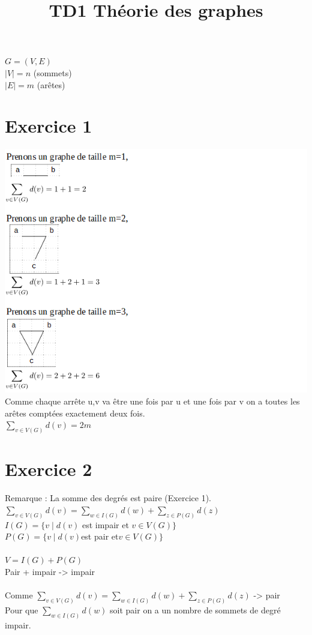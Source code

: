 \documentclass{article}
\title{TD1 Théorie des graphes}
\author{}
\date{}
\begin{document}
\maketitle{}
$G=(V,E)$ \\
$\mid V \mid =n$ (sommets) \\
$\mid E \mid =m$ (arêtes)
\section*{Exercice 1}
\includegraphics{Image/S1.PNG}
\newpage
Comme chaque arrête u,v va être une fois par u et une fois par v on a toutes les arêtes comptées exactement deux fois. \\
$\sum_{v \in V(G)} d(v)=2m$
\section*{Exercice 2}
Remarque : La somme des degrés est paire (Exercice 1). \\
$\sum_{v \in V(G)} d(v)= \sum_{w \in I(G)} d(w)+\sum_{z \in P(G)} d(z)$ \\
$I(G)=\{v \mid d(v)$ est impair et  $v \in V(G)\}$ \\
$P(G)=\{v \mid d(v) $est pair et$ v \in V(G)\}$ \\
\\
$V=I(G)+P(G)$
\\
Pair + impair -> impair \\
\\
Comme $\sum_{v \in V(G)} d(v)= \sum_{w \in I(G)} d(w)+\sum_{z \in P(G)} d(z)$ -> pair \\
Pour que $\sum_{w \in I(G)} d(w)$ soit pair on a un nombre de sommets de degré impair. 
\end{document}
